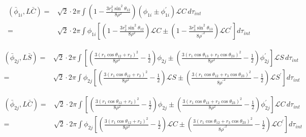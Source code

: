 \documentclass[Dissertation.tex]{subfiles}
\begin{document}
\begin{align}
\label{eq:DWavePhi1CBar}
\nonumber \left(\bar{\phi}_{1i},L \bar{C}\right) = & \sqrt{2} \cdot 2\pi \int \left(1 - \frac{3 r_2^2 \sin^2\theta_{12}}{8 \rho^2} \right) \left(\phi_{1i} \pm \phi_{1i}^\prime \right) \mathscr{L}C \, d\tau_{int} \\
=& \sqrt{2} \cdot 2\pi \int \phi_{1i} \left[ \left(1 - \frac{3 r_2^2 \sin^2\theta_{12}}{8 \rho^2} \right) \mathscr{L}C \pm \left(1 - \frac{3 r_3^2 \sin^2\theta_{13}}{8 {\rho^\prime}^2} \right) \mathscr{L}C^\prime \right] d\tau_{int}
\end{align}


\begin{align}
\label{eq:DWavePhi2SBar}
\nonumber \left(\bar{\phi}_{2j},L \bar{S}\right) = & \sqrt{2} \cdot 2\pi \int \left[ \left( \frac{3(r_1 \cos\theta_{12} + r_2)^2}{8 \rho^2} - \frac{1}{2} \right) \phi_{2j} \pm \left( \frac{3(r_1 \cos\theta_{13} + r_2 \cos\theta_{23})^2}{8 \rho^2} - \frac{1}{2} \right) \phi_{2j}^\prime \right] \mathscr{L}S \, d\tau_{int} \\
=& \sqrt{2} \cdot 2\pi \int \phi_{2j} \left[ \left( \frac{3(r_1 \cos\theta_{12} + r_2)^2}{8 \rho^2} - \frac{1}{2} \right) \mathscr{L}S \pm \left( \frac{3(r_1 \cos\theta_{12} + r_3 \cos\theta_{23})^2}{8 {\rho^\prime}^2} - \frac{1}{2} \right) \mathscr{L}S^\prime \right] d\tau_{int}
\end{align}

\begin{align}
\label{eq:DWavePhi2CBar}
\nonumber \left(\bar{\phi}_{2j},L \bar{C}\right) = & \sqrt{2} \cdot 2\pi \int \left[ \left( \frac{3(r_1 \cos\theta_{12} + r_2)^2}{8 \rho^2} - \frac{1}{2} \right) \phi_{2j} \pm \left( \frac{3(r_1 \cos\theta_{13} + r_2 \cos\theta_{23})^2}{8 \rho^2} - \frac{1}{2} \right) \phi_{2j}^\prime \right] \mathscr{L}C \, d\tau_{int} \\
=& \sqrt{2} \cdot 2\pi \int \phi_{2j} \left[ \left( \frac{3(r_1 \cos\theta_{12} + r_2)^2}{8 \rho^2} - \frac{1}{2} \right) \mathscr{L}C \pm \left( \frac{3(r_1 \cos\theta_{12} + r_3 \cos\theta_{23})^2}{8 {\rho^\prime}^2} - \frac{1}{2} \right) \mathscr{L}C^\prime \right] d\tau_{int}
\end{align}
\end{document}

